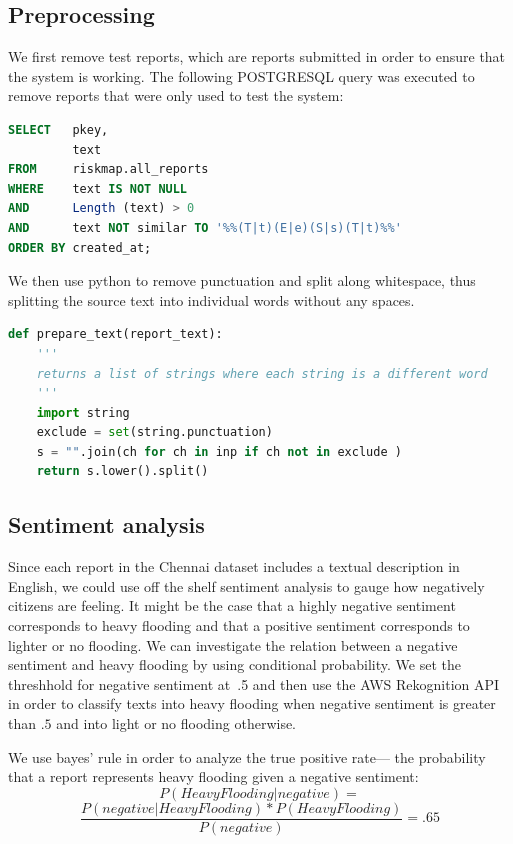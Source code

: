 \subsection{Preprocessing}
We first remove test reports, which are reports submitted in order to ensure
that the system is working. The following POSTGRESQL query was executed to remove
reports that were only used to test the system:

\begin{lstlisting}[language=SQL]
SELECT   pkey,
         text
FROM     riskmap.all_reports
WHERE    text IS NOT NULL
AND      Length (text) > 0
AND      text NOT similar TO '%%(T|t)(E|e)(S|s)(T|t)%%'
ORDER BY created_at;
\end{lstlisting}

We then use python to remove punctuation and split along whitespace, thus
splitting the source text into individual words without any spaces.

\begin{lstlisting}[language=python]
def prepare_text(report_text):
    '''
    returns a list of strings where each string is a different word
    '''
    import string
    exclude = set(string.punctuation)
    s = "".join(ch for ch in inp if ch not in exclude )
    return s.lower().split()
\end{lstlisting}

\subsection{Sentiment analysis}
Since each report in the Chennai dataset includes a textual description in English,
we could use off the shelf sentiment analysis to gauge how
negatively citizens are feeling. It might be the case that a highly negative
sentiment corresponds to heavy flooding and that a positive sentiment
corresponds to lighter or no flooding.  We can investigate the relation between
a negative sentiment and heavy flooding by using conditional probability. We set
the threshhold for negative sentiment at~.5 and then use the AWS Rekognition API
in order to classify texts into heavy flooding when negative sentiment is
greater than $.5$ and into light or no flooding otherwise.

We use bayes' rule in order to analyze the true positive rate--- the
probability that a report represents heavy flooding given a negative sentiment:
\\
$$P( Heavy Flooding | negative) = $$
$$\frac{P(negative | Heavy Flooding)*P(HeavyFlooding)}{P(negative)} =.65 $$
\\

